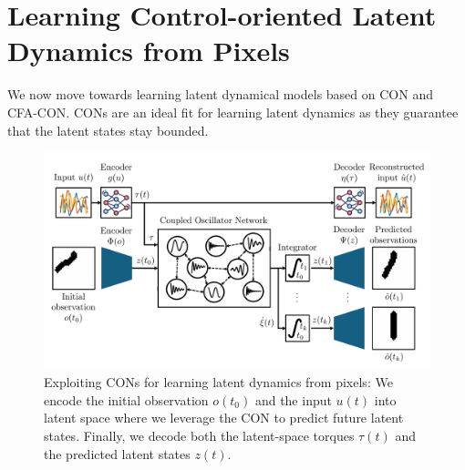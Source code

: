 \section{Learning Control-oriented Latent Dynamics from Pixels}\label{sec:learning_latent_space_dynamics}
We now move towards learning latent dynamical models based on \gls{CON} and \gls{CFA-CON}.
\glspl{CON} are an ideal fit for learning latent dynamics as they guarantee that the latent states stay bounded. 

\begin{figure}[t]
    \centering
    \includegraphics[width=1.0\linewidth]{con/figures/autoencoder/blockdiagram_autoencoder_v1_cropped.pdf}
    \caption{Exploiting \glspl{CON} for learning latent dynamics from pixels: We encode the initial observation $o(t_0)$ and the input $u(t)$ into latent space where we leverage the \gls{CON} to predict future latent states. Finally, we decode both the latent-space torques $\tau(t)$ and the predicted latent states $z(t)$.}
    \label{fig:con:blockdiagram_autoencoder}
\end{figure}

